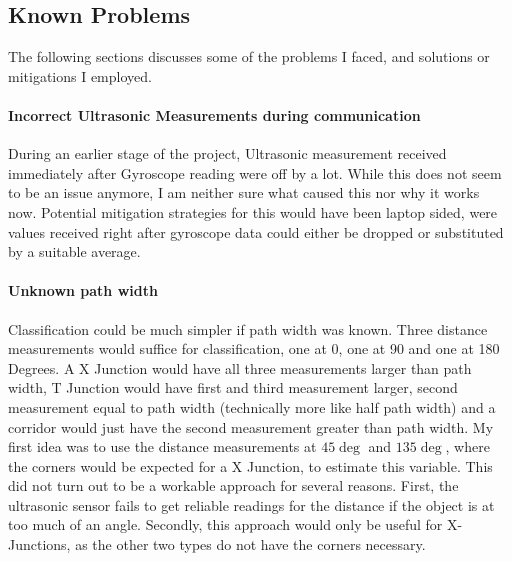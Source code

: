 \subsection{Known Problems}

The following sections discusses some of the problems I faced, and solutions or mitigations I employed.


\paragraph{Incorrect Ultrasonic Measurements during \IIC communication}
During an earlier stage of the project, Ultrasonic measurement received immediately after Gyroscope reading were off
by a lot.
While this does not seem to be an issue anymore, I am neither sure what caused this nor why it works now.
Potential mitigation strategies for this would have been laptop sided, were values received right after gyroscope data
could either be dropped or substituted by a suitable average.


\paragraph{Unknown path width}
Classification could be much simpler if path width was known. Three distance measurements would suffice for classification, one at 0, one at 90 and one at 180 Degrees.
A X Junction would have all three measurements larger than path width,
T Junction would have first and third measurement larger, second measurement equal to path width (technically more like half path width) and
a corridor would just have the second measurement greater than path width.
My first idea was to use the distance measurements at $45\deg$ and $135\deg$, where the corners would be expected for a X Junction, to estimate this variable.
This did not turn out to be a workable approach for several reasons.
First, the ultrasonic sensor fails to get reliable readings for the distance if the object is at too much of an angle.
Secondly, this approach would only be useful for X-Junctions, as the other two types do not have the corners necessary.

